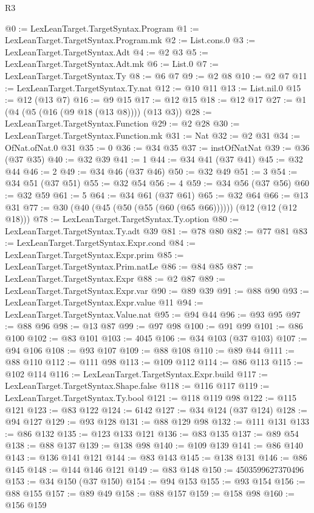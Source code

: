 \begin{lexlean}{R3}
\begin{coremodule}
@0 := LexLeanTarget.TargetSyntax.Program
@1 := LexLeanTarget.TargetSyntax.Program.mk
@2 := List.cons.{0}
@3 := LexLeanTarget.TargetSyntax.Adt
@4 := @2 @3
@5 := LexLeanTarget.TargetSyntax.Adt.mk
@6 := List.{0}
@7 := LexLeanTarget.TargetSyntax.Ty
@8 := @6 @7
@9 := @2 @8
@10 := @2 @7
@11 := LexLeanTarget.TargetSyntax.Ty.nat
@12 := @10 @11
@13 := List.nil.{0}
@15 := @12 (@13 @7)
@16 := @9 @15
@17 := @12 @15
@18 := @12 @17
@27 := @1 (@4 (@5 (@16 (@9 @18 (@13 @8)))) (@13 @3))
@28 := LexLeanTarget.TargetSyntax.Function
@29 := @2 @28
@30 := LexLeanTarget.TargetSyntax.Function.mk
@31 := Nat
@32 := @2 @31
@34 := OfNat.ofNat.{0} @31
@35 := 0
@36 := @34 @35
@37 := instOfNatNat
@39 := @36 (@37 @35)
@40 := @32 @39
@41 := 1
@44 := @34 @41 (@37 @41)
@45 := @32 @44
@46 := 2
@49 := @34 @46 (@37 @46)
@50 := @32 @49
@51 := 3
@54 := @34 @51 (@37 @51)
@55 := @32 @54
@56 := 4
@59 := @34 @56 (@37 @56)
@60 := @32 @59
@61 := 5
@64 := @34 @61 (@37 @61)
@65 := @32 @64
@66 := @13 @31
@77 := @30 (@40 (@45 (@50 (@55 (@60 (@65 @66)))))) (@12 (@12 (@12 @18)))
@78 := LexLeanTarget.TargetSyntax.Ty.option
@80 := LexLeanTarget.TargetSyntax.Ty.adt @39
@81 := @78 @80
@82 := @77 @81
@83 := LexLeanTarget.TargetSyntax.Expr.cond
@84 := LexLeanTarget.TargetSyntax.Expr.prim
@85 := LexLeanTarget.TargetSyntax.Prim.natLe
@86 := @84 @85
@87 := LexLeanTarget.TargetSyntax.Expr
@88 := @2 @87
@89 := LexLeanTarget.TargetSyntax.Expr.var
@90 := @89 @39
@91 := @88 @90
@93 := LexLeanTarget.TargetSyntax.Expr.value @11
@94 := LexLeanTarget.TargetSyntax.Value.nat
@95 := @94 @44
@96 := @93 @95
@97 := @88 @96
@98 := @13 @87
@99 := @97 @98
@100 := @91 @99
@101 := @86 @100
@102 := @83 @101
@103 := 4045
@106 := @34 @103 (@37 @103)
@107 := @94 @106
@108 := @93 @107
@109 := @88 @108
@110 := @89 @44
@111 := @88 @110
@112 := @111 @98
@113 := @109 @112
@114 := @86 @113
@115 := @102 @114
@116 := LexLeanTarget.TargetSyntax.Expr.build
@117 := LexLeanTarget.TargetSyntax.Shape.false
@118 := @116 @117
@119 := LexLeanTarget.TargetSyntax.Ty.bool
@121 := @118 @119 @98
@122 := @115 @121
@123 := @83 @122
@124 := 6142
@127 := @34 @124 (@37 @124)
@128 := @94 @127
@129 := @93 @128
@131 := @88 @129 @98
@132 := @111 @131
@133 := @86 @132
@135 := @123 @133 @121
@136 := @83 @135
@137 := @89 @54
@138 := @88 @137
@139 := @138 @98
@140 := @109 @139
@141 := @86 @140
@143 := @136 @141 @121
@144 := @83 @143
@145 := @138 @131
@146 := @86 @145
@148 := @144 @146 @121
@149 := @83 @148
@150 := 4503599627370496
@153 := @34 @150 (@37 @150)
@154 := @94 @153
@155 := @93 @154
@156 := @88 @155
@157 := @89 @49
@158 := @88 @157
@159 := @158 @98
@160 := @156 @159

\end{coremodule}
\end{lexlean}
